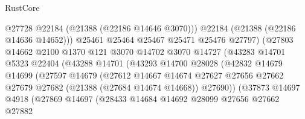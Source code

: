 \begin{lexlean}{RustCore}
\begin{coremodule}
                                    @27728
                                    @22184
                                    (@21388 (@22186 @14646 @3070)))
                                  @22184
                                  (@21388 (@22186 @14636 @14652)))
                                @25461
                                @25464
                                @25467
                                @25471
                                @25476
                                @27797)
                              (@27803
                                @14662
                                @2100
                                @1370
                                @121
                                @3070
                                @14702
                                @3070
                                @14727
                                (@43283
                                  @14701
                                  @5323
                                  @22404
                                  (@43288
                                    @14701
                                    (@43293
                                      @14700
                                      @28028
                                      (@42832
                                        @14679
                                        @14699
                                        (@27597
                                          @14679
                                          (@27612
                                            @14667
                                            @14674
                                            @27627
                                            @27656
                                            @27662
                                            @27679
                                            @27682
                                            (@21388 (@27684 @14674 @14668))
                                            @27690))
                                        (@37873
                                          @14697
                                          @4918
                                          (@27869
                                            @14697
                                            (@28433
                                              @14684
                                              @14692
                                              @28099
                                              @27656
                                              @27662
                                              @27882

\end{coremodule}
\end{lexlean}
